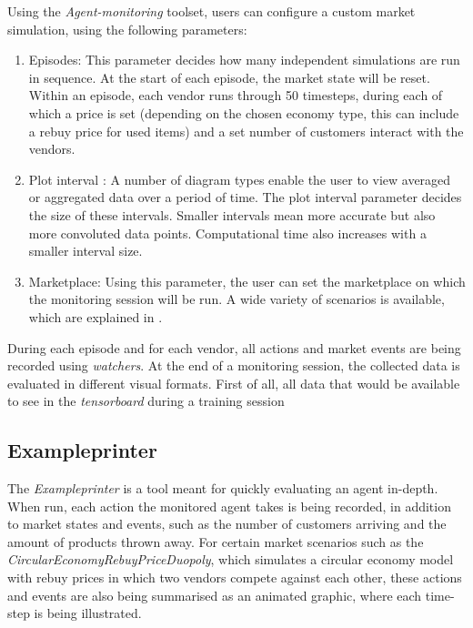 Using the \emph{Agent-monitoring} toolset, users can configure a custom market simulation, using the following parameters:

\begin{enumerate}
	\item Episodes: This parameter decides how many independent simulations are run in sequence. At the start of each episode, the market state will be reset. Within an episode, each vendor runs through 50 timesteps, during each of which a price is set (depending on the chosen economy type, this can include a rebuy price for used items) and a set number of customers interact with the vendors.
	\item Plot interval : A number of diagram types enable the user to view averaged or aggregated data over a period of time. The plot interval parameter decides the size of these intervals. Smaller intervals mean more accurate but also more convoluted data points. Computational time also increases with a smaller interval size.
	\item Marketplace: Using this parameter, the user can set the marketplace on which the monitoring session will be run. A wide variety of scenarios is available, which are explained in .
\end{enumerate}

During each episode and for each vendor, all actions and market events are being recorded using \emph{watchers}. At the end of a monitoring session, the collected data is evaluated in different visual formats. First of all, all data that would be available to see in the \emph{tensorboard} during a training session 

\subsection{Exampleprinter}

The \emph{Exampleprinter} is a tool meant for quickly evaluating an agent in-depth. When run, each action the monitored agent takes is being recorded, in addition to market states and events, such as the number of customers arriving and the amount of products thrown away. For certain market scenarios such as the \emph{CircularEconomyRebuyPriceDuopoly}, which simulates a circular economy model with rebuy prices in which two vendors compete against each other, these actions and events are also being summarised as an animated graphic, where each time-step is being illustrated. 

